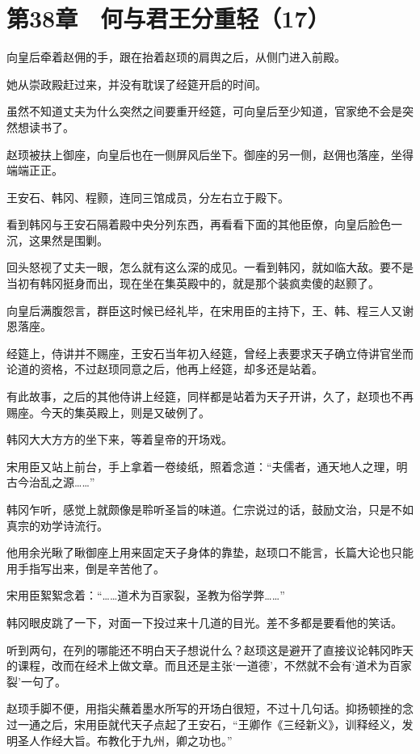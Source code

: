 \section{第38章　何与君王分重轻（17）}

向皇后牵着赵佣的手，跟在抬着赵顼的肩舆之后，从侧门进入前殿。

她从崇政殿赶过来，并没有耽误了经筵开启的时间。

虽然不知道丈夫为什么突然之间要重开经筵，可向皇后至少知道，官家绝不会是突然想读书了。

赵顼被扶上御座，向皇后也在一侧屏风后坐下。御座的另一侧，赵佣也落座，坐得端端正正。

王安石、韩冈、程颢，连同三馆成员，分左右立于殿下。

看到韩冈与王安石隔着殿中央分列东西，再看看下面的其他臣僚，向皇后脸色一沉，这果然是围剿。

回头怒视了丈夫一眼，怎么就有这么深的成见。一看到韩冈，就如临大敌。要不是当初有韩冈挺身而出，现在坐在集英殿中的，就是那个装疯卖傻的赵颢了。

向皇后满腹怨言，群臣这时候已经礼毕，在宋用臣的主持下，王、韩、程三人又谢恩落座。

经筵上，侍讲并不赐座，王安石当年初入经筵，曾经上表要求天子确立侍讲官坐而论道的资格，不过赵顼同意之后，他再上经筵，却多还是站着。

有此故事，之后的其他侍讲上经筵，同样都是站着为天子开讲，久了，赵顼也不再赐座。今天的集英殿上，则是又破例了。

韩冈大大方方的坐下来，等着皇帝的开场戏。

宋用臣又站上前台，手上拿着一卷绫纸，照着念道：“夫儒者，通天地人之理，明古今治乱之源……”

韩冈乍听，感觉上就颇像是聆听圣旨的味道。仁宗说过的话，鼓励文治，只是不如真宗的劝学诗流行。

他用余光瞅了瞅御座上用来固定天子身体的靠垫，赵顼口不能言，长篇大论也只能用手指写出来，倒是辛苦他了。

宋用臣絮絮念着：“……道术为百家裂，圣教为俗学弊……”

韩冈眼皮跳了一下，对面一下投过来十几道的目光。差不多都是要看他的笑话。

听到两句，在列的哪能还不明白天子想说什么？赵顼这是避开了直接议论韩冈昨天的课程，改而在经术上做文章。而且还是主张‘一道德’，不然就不会有‘道术为百家裂’一句了。

赵顼手脚不便，用指尖蘸着墨水所写的开场白很短，不过十几句话。抑扬顿挫的念过一通之后，宋用臣就代天子点起了王安石，“王卿作《三经新义》，训释经义，发明圣人作经大旨。布教化于九州，卿之功也。”

